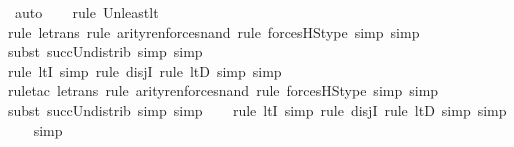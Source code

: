 \begin{isabellebody}
\ auto{\isacharbrackleft}{\kern0pt}{}{\isacharbrackright}{\kern0pt}\isanewline
\ \ \ \isamarkupfalse%
{\isacharparenleft}{\kern0pt}rule\ Un{\isacharunderscore}{\kern0pt}least{\isacharunderscore}{\kern0pt}lt{\isacharparenright}{\kern0pt}{\isacharplus}{\kern0pt}\ \isanewline
\ \ \ \ \isamarkupfalse%
{\isacharparenleft}{\kern0pt}rule\ le{\isacharunderscore}{\kern0pt}trans{\isacharcomma}{\kern0pt}\ rule\ arity{\isacharunderscore}{\kern0pt}ren{\isacharunderscore}{\kern0pt}forces{\isacharunderscore}{\kern0pt}nand{\isacharcomma}{\kern0pt}\ rule\ forcesHS{\isacharprime}{\kern0pt}{\isacharunderscore}{\kern0pt}type{\isacharcomma}{\kern0pt}\ simp{\isacharcomma}{\kern0pt}\ simp{\isacharparenright}{\kern0pt}\isanewline
\ \ \ \ \isamarkupfalse%
{\isacharparenleft}{\kern0pt}subst\ succ{\isacharunderscore}{\kern0pt}Un{\isacharunderscore}{\kern0pt}distrib{\isacharcomma}{\kern0pt}\ simp{\isacharcomma}{\kern0pt}\ simp{\isacharparenright}{\kern0pt}{\isacharplus}{\kern0pt}\isanewline
\ \ \ \ \isamarkupfalse%
{\isacharparenleft}{\kern0pt}rule\ ltI{\isacharcomma}{\kern0pt}\ simp\ {\isacharcomma}{\kern0pt}rule\ disjI{}{\isacharcomma}{\kern0pt}\ rule\ ltD{\isacharcomma}{\kern0pt}\ simp{\isacharcomma}{\kern0pt}\ simp{\isacharparenright}{\kern0pt}\isanewline
\ \ \ \isamarkupfalse%
{\isacharparenleft}{\kern0pt}rule{\isacharunderscore}{\kern0pt}tac\ le{\isacharunderscore}{\kern0pt}trans{\isacharcomma}{\kern0pt}\ rule\ arity{\isacharunderscore}{\kern0pt}ren{\isacharunderscore}{\kern0pt}forces{\isacharunderscore}{\kern0pt}nand{\isacharcomma}{\kern0pt}\ rule\ forcesHS{\isacharprime}{\kern0pt}{\isacharunderscore}{\kern0pt}type{\isacharcomma}{\kern0pt}\ simp{\isacharcomma}{\kern0pt}\ simp{\isacharparenright}{\kern0pt}\isanewline
\ \ \ \isamarkupfalse%
{\isacharparenleft}{\kern0pt}subst\ succ{\isacharunderscore}{\kern0pt}Un{\isacharunderscore}{\kern0pt}distrib{\isacharcomma}{\kern0pt}\ simp{\isacharcomma}{\kern0pt}\ simp{\isacharparenright}{\kern0pt}{\isacharplus}{\kern0pt}\isanewline
\ \ \ \isamarkupfalse%
{\isacharparenleft}{\kern0pt}rule\ ltI{\isacharcomma}{\kern0pt}\ simp\ {\isacharcomma}{\kern0pt}rule\ disjI{}{\isacharcomma}{\kern0pt}\ rule\ ltD{\isacharcomma}{\kern0pt}\ simp{\isacharcomma}{\kern0pt}\ simp{\isacharparenright}{\kern0pt}\isanewline
\ \ \isamarkupfalse%
\ simp\isanewline
\ \ \isamarkupfalse%

\end{isabellebody}
